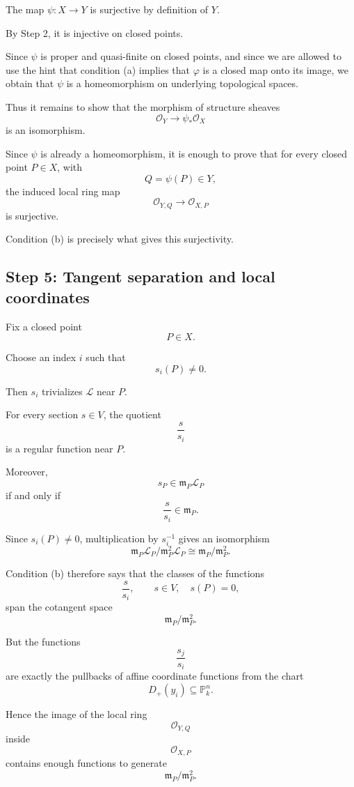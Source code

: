 \documentclass[12pt,a4paper]{article}
\theoremstyle{notespace}
\begin{document}
The map $\psi:X\to Y$ is surjective by definition of $Y$.

By Step 2, it is injective on closed points.

Since $\psi$ is proper and quasi-finite on closed points, and since we are
allowed to use the hint that condition (a) implies that $\varphi$ is a closed
map onto its image, we obtain that $\psi$ is a homeomorphism on underlying
topological spaces.

Thus it remains to show that the morphism of structure sheaves
\[
\mathcal O_Y\longrightarrow \psi_*\mathcal O_X
\]
is an isomorphism.

Since $\psi$ is already a homeomorphism, it is enough to prove that for every
closed point $P\in X$, with
\[
Q=\psi(P)\in Y,
\]
the induced local ring map
\[
\mathcal O_{Y,Q}\longrightarrow \mathcal O_{X,P}
\]
is surjective.

Condition (b) is precisely what gives this surjectivity.

\subsection*{Step 5: Tangent separation and local coordinates}

Fix a closed point
\[
P\in X.
\]

Choose an index $i$ such that
\[
s_i(P)\neq0.
\]

Then $s_i$ trivializes $\mathcal L$ near $P$.

For every section $s\in V$, the quotient
\[
\frac{s}{s_i}
\]
is a regular function near $P$.

Moreover,
\[
s_P\in \mathfrak m_P\mathcal L_P
\]
if and only if
\[
\frac{s}{s_i}\in \mathfrak m_P.
\]

Since $s_i(P)\neq0$, multiplication by $s_i^{-1}$ gives an isomorphism
\[
\mathfrak m_P\mathcal L_P/\mathfrak m_P^2\mathcal L_P
\cong
\mathfrak m_P/\mathfrak m_P^2.
\]

Condition (b) therefore says that the classes of the functions
\[
\frac{s}{s_i},
\qquad
s\in V,\quad s(P)=0,
\]
span the cotangent space
\[
\mathfrak m_P/\mathfrak m_P^2.
\]

But the functions
\[
\frac{s_j}{s_i}
\]
are exactly the pullbacks of affine coordinate functions from the chart
\[
D_+(y_i)\subseteq \mathbb P_k^n.
\]

Hence the image of the local ring
\[
\mathcal O_{Y,Q}
\]
inside
\[
\mathcal O_{X,P}
\]
contains enough functions to generate
\[
\mathfrak m_P/\mathfrak m_P^2.
\]
\end{document}
